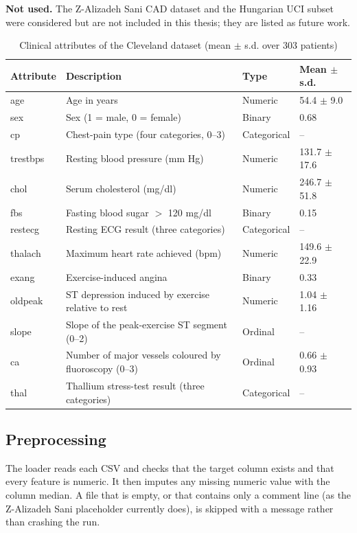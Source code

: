 \documentclass[MTech]{ugthesis}
\begin{document}
\textbf{Not used.} The Z-Alizadeh Sani CAD dataset \citep{alizadehsani2013} and the Hungarian UCI subset were considered but are not included in this thesis; they are listed as future work.

\begin{table}[htpb]
\small
\renewcommand{\arraystretch}{1.25}
\caption{Clinical attributes of the Cleveland dataset (mean $\pm$ s.d. over 303 patients)}
\label{tab:features}
\begin{tabular}{|p{1.7cm}|p{7.2cm}|p{2.2cm}|p{2.3cm}|}
\hline
\textbf{Attribute} & \textbf{Description} & \textbf{Type} & \textbf{Mean $\pm$ s.d.} \\ \hline
age & Age in years & Numeric & 54.4 $\pm$ 9.0 \\ \hline
sex & Sex (1 = male, 0 = female) & Binary & 0.68 \\ \hline
cp & Chest-pain type (four categories, 0--3) & Categorical & -- \\ \hline
trestbps & Resting blood pressure (mm Hg) & Numeric & 131.7 $\pm$ 17.6 \\ \hline
chol & Serum cholesterol (mg/dl) & Numeric & 246.7 $\pm$ 51.8 \\ \hline
fbs & Fasting blood sugar $>$ 120 mg/dl & Binary & 0.15 \\ \hline
restecg & Resting ECG result (three categories) & Categorical & -- \\ \hline
thalach & Maximum heart rate achieved (bpm) & Numeric & 149.6 $\pm$ 22.9 \\ \hline
exang & Exercise-induced angina & Binary & 0.33 \\ \hline
oldpeak & ST depression induced by exercise relative to rest & Numeric & 1.04 $\pm$ 1.16 \\ \hline
slope & Slope of the peak-exercise ST segment (0--2) & Ordinal & -- \\ \hline
ca & Number of major vessels coloured by fluoroscopy (0--3) & Ordinal & 0.66 $\pm$ 0.93 \\ \hline
thal & Thallium stress-test result (three categories) & Categorical & -- \\ \hline
\end{tabular}
\end{table}

\subsection{Preprocessing}
The loader reads each CSV and checks that the target column exists and that every feature is numeric. It then imputes any missing numeric value with the column median. A file that is empty, or that contains only a comment line (as the Z-Alizadeh Sani placeholder currently does), is skipped with a message rather than crashing the run.
\end{document}

